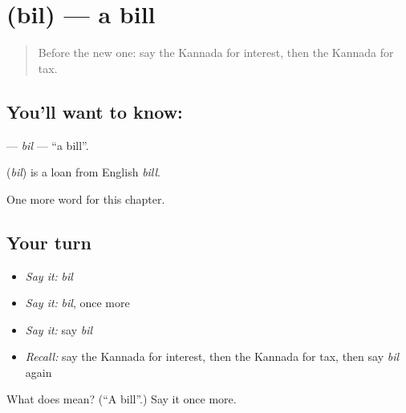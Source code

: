 \section[\texorpdfstring{\kn{ಬಿಲ್} (bil)}{ಬಿಲ್ (bil)}]{ (bil) — a bill}

\label{lesson:KA-C195-bil}



\begin{quote}
Before the new one: say the Kannada for interest, then the Kannada for tax.
\end{quote}

\subsection*{You'll want to know: }
\textbf{} — \emph{bil} — \textquotedblleft{}a bill\textquotedblright{}.

\begin{cousinweb}
\textbf{} (\emph{bil}) is a loan from English \emph{bill}.
\end{cousinweb}

\begin{grammarlens}[title={What you've built}]
One more word for this chapter.
\end{grammarlens}

\subsection*{Your turn}
\begin{itemize}
\raggedright
  \item \emph{Say it:} \emph{bil}
  \item \emph{Say it:} \emph{bil}, once more
  \item \emph{Say it:} say \emph{bil}
  \item \emph{Recall:} say the Kannada for interest, then the Kannada for tax, then say \emph{bil} again
\end{itemize}

\begin{tcolorbox}[breakable,colback=teal!4,colframe=teal!35!black,title={Before you move on}]
What does  mean? (\textquotedblleft{}A bill\textquotedblright{}.) Say it once more.
\end{tcolorbox}
